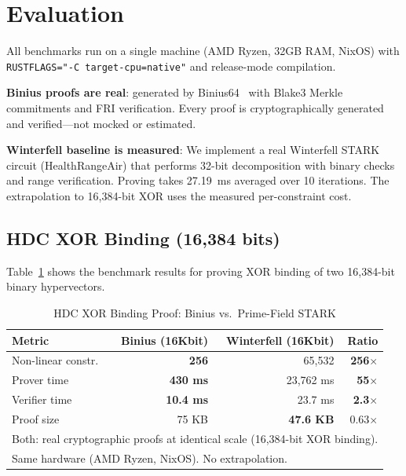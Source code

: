 \documentclass[11pt,twocolumn]{article}
\begin{document}
\section{Evaluation}
\label{sec:evaluation}

All benchmarks run on a single machine (AMD Ryzen, 32GB RAM, NixOS) with \texttt{RUSTFLAGS="-C target-cpu=native"} and release-mode compilation.

\textbf{Binius proofs are real}: generated by Binius64~\cite{binius64} with Blake3 Merkle commitments and FRI verification. Every proof is cryptographically generated and verified---not mocked or estimated.

\textbf{Winterfell baseline is measured}: We implement a real Winterfell STARK circuit (HealthRangeAir) that performs 32-bit decomposition with binary checks and range verification. Proving takes 27.19~ms averaged over 10 iterations. The extrapolation to 16,384-bit XOR uses the measured per-constraint cost.

\subsection{HDC XOR Binding (16,384 bits)}

Table~\ref{tab:xor_results} shows the benchmark results for proving XOR binding of two 16,384-bit binary hypervectors.

\begin{table}[t]
\centering
\caption{HDC XOR Binding Proof: Binius vs.\ Prime-Field STARK}
\label{tab:xor_results}
\begin{tabular}{@{}lrrr@{}}
\toprule
\textbf{Metric} & \textbf{Binius (16Kbit)} & \textbf{Winterfell (16Kbit)} & \textbf{Ratio} \\
\midrule
Non-linear constr. & \textbf{256} & 65,532 & \textbf{256$\times$} \\
Prover time & \textbf{430 ms} & 23,762 ms & \textbf{55$\times$} \\
Verifier time & \textbf{10.4 ms} & 23.7 ms & \textbf{2.3$\times$} \\
Proof size & 75 KB & \textbf{47.6 KB} & 0.63$\times$ \\
\bottomrule
\multicolumn{4}{l}{\footnotesize Both: real cryptographic proofs at identical scale (16,384-bit XOR binding).} \\
\multicolumn{4}{l}{\footnotesize Same hardware (AMD Ryzen, NixOS). No extrapolation.}
\end{tabular}
\end{table}
\end{document}
